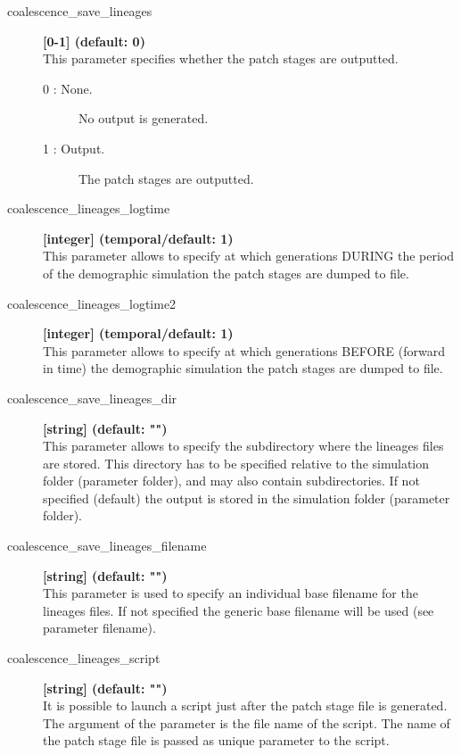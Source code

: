 \documentclass[letterpaper,12pt,oneside]{book}
\begin{document}
\begin{description} 
\item[coalescence\_save\_lineages] \textbf{[0-1] (default: 0)} \\
This parameter specifies whether the patch stages are outputted.
\begin{description}
\item [0 : None.] No output is generated.
\item [1 : Output.] The patch stages are outputted.
\end{description} 

\item[coalescence\_lineages\_logtime] \textbf{[integer] (temporal/default: 1)}\\
This parameter allows to specify at which generations DURING the period of the demographic simulation the patch stages are dumped to file. 

\item[coalescence\_lineages\_logtime2] \textbf{[integer] (temporal/default: 1)}\\
This parameter allows to specify at which generations BEFORE (forward in time) the demographic simulation the patch stages are dumped to file. 

\item[coalescence\_save\_lineages\_dir] \textbf{[string] (default: "")}\\
This parameter allows to specify the subdirectory where the lineages files are stored. This directory has to be specified relative to the simulation folder (parameter \textsf{folder}), and may also contain subdirectories. If not specified (default) the output is stored in the simulation folder (parameter \textsf{folder}).

\item[coalescence\_save\_lineages\_filename] \textbf{[string] (default: "")}\\
This parameter is used to specify an individual base filename for the lineages files. If not specified the generic base filename will be used (see parameter \textsf{filename}).

\item[coalescence\_lineages\_script] \textbf{[string] (default: "")}\\
It is possible to launch a script just after the patch stage file is generated. The argument of the parameter is the file name of the script. The name of the patch stage file is passed as unique parameter to the script. 
\end{description}
\end{document}
